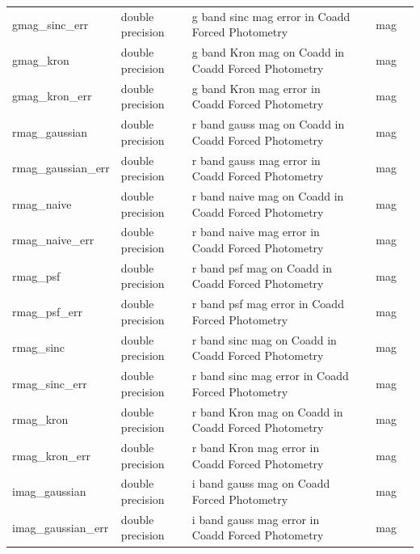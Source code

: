 \documentclass[12pt]{article}
\begin{document}
\begin{table}[thbp]
\begin{center}
{\begin{tabular}{llllll}
gmag\_sinc\_err & double precision & g band sinc mag error in Coadd Forced Photometry        &                            & mag            &   \\
gmag\_kron & double precision & g band Kron mag on Coadd in Coadd Forced Photometry         &                            & mag            &  \\
gmag\_kron\_err & double precision & g band Kron mag error in Coadd Forced Photometry        &                            & mag            &   \\
rmag\_gaussian & double precision & r band gauss mag on Coadd in Coadd Forced Photometry      &                            & mag            &   \\
rmag\_gaussian\_err & double precision & r band gauss mag error in Coadd Forced Photometry     &                            & mag            &   \\
rmag\_naive & double precision & r band naive mag on Coadd in Coadd Forced Photometry         &                            & mag            &   \\
rmag\_naive\_err & double precision & r band naive mag error in Coadd Forced Photometry        &                            & mag            &   \\
rmag\_psf & double precision & r band psf mag on Coadd in Coadd Forced Photometry         &                            & mag            &  \\
rmag\_psf\_err & double precision & r band psf mag error in Coadd Forced Photometry        &                            & mag            &   \\
rmag\_sinc & double precision & r band sinc mag on Coadd in Coadd Forced Photometry         &                            & mag            &  \\
rmag\_sinc\_err & double precision & r band sinc mag error in Coadd Forced Photometry        &                            & mag            &   \\
rmag\_kron & double precision & r band Kron mag on Coadd in Coadd Forced Photometry         &                            & mag            &  \\
rmag\_kron\_err & double precision & r band Kron mag error in Coadd Forced Photometry        &                            & mag            &   \\
imag\_gaussian & double precision & i band gauss mag on Coadd Forced Photometry               &                            & mag            &   \\
imag\_gaussian\_err & double precision & i band gauss mag error in Coadd Forced Photometry     &                            & mag            &   \\

\end{tabular}}
\end{center}
\end{table}
\end{document}
